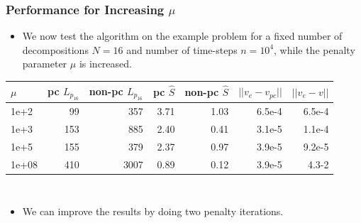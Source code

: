 \documentclass[9pt]{beamer}
\begin{document}
\begin{frame}
\frametitle{Performance for Increasing $\mu$}
\begin{itemize}
\item{We now test the algorithm on the example problem for a fixed number of decompositions $N=16$ and number of time-steps $n=10^4$, while the penalty parameter $\mu$ is increased.}
\end{itemize}
\begin{table}
\centering
\begin{tabular}{lrrrrrr}
\toprule
{} $\mu$&    pc $L_{p_{16}}$ & non-pc $L_{p_{16}}$  &  pc $\hat S$ & non-pc $\hat S$ &  $||v_e-v_{pc}||$ &      $||v_e-v||$\\
\midrule
1e+2   &   99 &  357 &  3.71 &  1.03 &  6.5e-4 &   6.5e-4\\
1e+3  &  153 &  885 &  2.40 &  0.41 &  3.1e-5 &  1.1e-4 \\
1e+5 &  155 &  379 &  2.37 &  0.97 &  3.9e-5 &  9.2e-5 \\
1e+08 &  410 &  3007 &  0.89 &  0.12 &  3.9e-5 &  4.3-2 \\
\bottomrule
\end{tabular}
\end{table}
\begin{columns}
\begin{itemize}
\item<2->{We can improve the results by doing two penalty iterations.}
\end{itemize}
\end{columns}
\end{frame}
\end{document}
